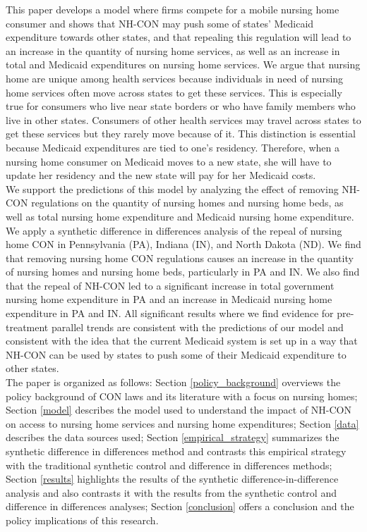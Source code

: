 \documentclass[../Main.tex]{subfiles}
\begin{document}
\indent This paper develops a model where firms compete for a mobile nursing home consumer and shows that NH-CON may push some of states’ Medicaid expenditure towards other states, and that repealing this regulation will lead to an increase in the quantity of nursing home services, as well as an increase in total and Medicaid expenditures on nursing home services. We argue that nursing home are unique among health services because individuals in need of nursing home services often move across states to get these services. This is especially true for consumers who live near state borders or who have family members who live in other states. Consumers of other health services may travel across states to get these services but they rarely move because of it. This distinction is essential because Medicaid expenditures are tied to one's residency. Therefore, when a nursing home consumer on Medicaid moves to a new state, she will have to update her residency and the new state will pay for her Medicaid costs.\\
\indent We support the predictions of this model by analyzing the effect of removing NH-CON regulations on the quantity of nursing homes and nursing home beds, as well as total nursing home expenditure and Medicaid nursing home expenditure. We apply a synthetic difference in differences analysis of the repeal of nursing home CON in Pennsylvania (PA), Indiana (IN), and North Dakota (ND). We find that removing nursing home CON regulations causes an increase in the quantity of nursing homes and nursing home beds, particularly in PA and IN. We also find that the repeal of NH-CON led to a significant increase in total government nursing home expenditure in PA and an increase in Medicaid nursing home expenditure in PA and IN. All significant results where we find evidence for pre-treatment parallel trends are consistent with the predictions of our model and consistent with the idea that the current Medicaid system is set up in a way that NH-CON can be used by states to push some of their Medicaid expenditure to other states. \\
\indent The paper is organized as follows: Section \ref{policy_background} overviews the policy background of CON laws and its literature with a focus on nursing homes; Section \ref{model} describes the model used to understand the impact of  NH-CON on access to nursing home services and nursing home expenditures; Section \ref{data} describes the data sources used; Section \ref{empirical_strategy} summarizes the synthetic difference in differences method and contrasts this empirical strategy with the traditional synthetic control and difference in differences methods; Section \ref{results} highlights the results of the synthetic difference-in-difference analysis and also contrasts it with the results from the synthetic control and difference in differences analyses; Section \ref{conclusion} offers a conclusion and the policy implications of this research.
\end{document}
